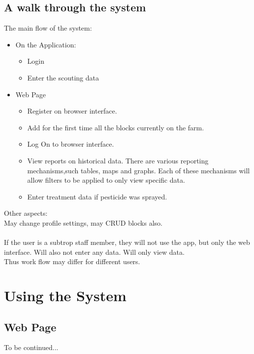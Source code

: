 \documentclass[11pt,a4paper,titlepage]{article}
\begin{document}
\subsection{A walk through the system}


The main flow of the system:\\
\begin{itemize}
\item On the Application: 
	\begin{itemize}
		\item Login
		\item Enter the scouting data
	\end{itemize}
\item Web Page
	\begin{itemize}
		\item Register on browser interface.
		\item Add for the first time all the blocks currently on the farm.
		\item Log On to browser interface.
		\item View reports on historical data. There are various reporting mechanisms,such tables, maps and graphs. Each of these mechanisms will allow filters to be applied to only view specific data.
\item Enter treatment data if pesticide was sprayed.
	\end{itemize}
\end{itemize}


Other aspects:\\
May change profile settings, may CRUD blocks also.\\\\

If the user is a subtrop staff member, they will not use the app, but only the web interface. Will also not enter any data. Will only view data.\\

Thus work flow may differ for different users.



\section{Using the System}
\subsection{Web Page}
		 To be continued...
\end{document}
